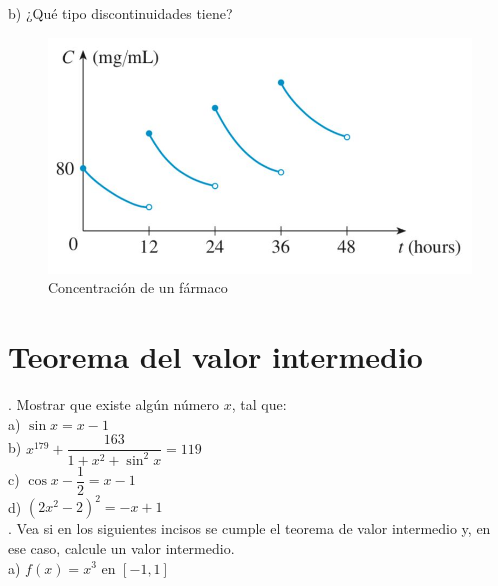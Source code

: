 \documentclass[letterpaper]{article}
\begin{document}

b) ¿Qué tipo discontinuidades tiene?\\


	\begin{figure}[h!]
		\centering
		\includegraphics[scale=0.7]{img/farmaco}
		\caption{Concentración de un fármaco}
	\end{figure}

\section*{Teorema del valor intermedio}

. Mostrar que existe algún número $ x $, tal que:\\

a) $ \sin x  = x-1$\\


b) $ x^{179}+ \dfrac{163}{1+x^{2}+\sin^{2}x} = 119 $\\
	

c) $ \cos x-\dfrac{1}{2} = x-1 $\\


d) $ (2x^{2}-2)^{2} = -x +1 $\\


. Vea si en los siguientes incisos se cumple el teorema de valor intermedio y, en ese caso, calcule un valor intermedio.\\

a) $ f(x) = x^{3} \text{  en  } [-1,1] $\\
\end{document}
